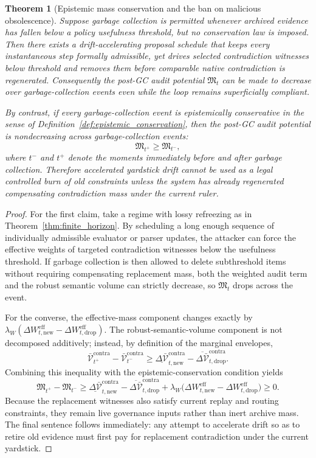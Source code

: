 \documentclass[11pt]{article}
\newtheorem{theorem}{Theorem}[section]
\theoremstyle{definition}
\newcommand{\1}{\mathbf{1}}
\begin{document}
\begin{theorem}[Epistemic mass conservation and the ban on malicious obsolescence]\label{thm:epistemic_conservation}
Suppose garbage collection is permitted whenever archived evidence has fallen below a policy usefulness threshold, but no conservation law is imposed. Then there exists a drift-accelerating proposal schedule that keeps every instantaneous step formally admissible, yet drives selected contradiction witnesses below threshold and removes them before comparable native contradiction is regenerated. Consequently the post-GC audit potential $\mathfrak M_t$ can be made to decrease over garbage-collection events even while the loop remains superficially compliant.

By contrast, if every garbage-collection event is epistemically conservative in the sense of Definition~\ref{def:epistemic_conservation}, then the post-GC audit potential is nondecreasing across garbage-collection events:
\[
\mathfrak M_{t^+} \ge \mathfrak M_{t^-},
\]
where $t^-$ and $t^+$ denote the moments immediately before and after garbage collection. Therefore accelerated yardstick drift cannot be used as a legal controlled burn of old constraints unless the system has already regenerated compensating contradiction mass under the current ruler.
\end{theorem}

\begin{proof}
For the first claim, take a regime with lossy refreezing as in Theorem~\ref{thm:finite_horizon}. By scheduling a long enough sequence of individually admissible evaluator or parser updates, the attacker can force the effective weights of targeted contradiction witnesses below the usefulness threshold. If garbage collection is then allowed to delete subthreshold items without requiring compensating replacement mass, both the weighted audit term and the robust semantic volume can strictly decrease, so $\mathfrak M_t$ drops across the event.

For the converse, the effective-mass component changes exactly by $\lambda_W(\Delta W_{t,\mathrm{new}}^{\mathrm{eff}}-\Delta W_{t,\mathrm{drop}}^{\mathrm{eff}})$. The robust-semantic-volume component is not decomposed additively; instead, by definition of the marginal envelopes,
\[
\bar{\mathcal V}_{t^+}^{\mathrm{contra}}-\bar{\mathcal V}_{t^-}^{\mathrm{contra}}
\ge
\underline{\Delta \bar{\mathcal V}}_{t,\mathrm{new}}^{\mathrm{contra}}-
\overline{\Delta \bar{\mathcal V}}_{t,\mathrm{drop}}^{\mathrm{contra}}.
\]
Combining this inequality with the epistemic-conservation condition yields
\[
\mathfrak M_{t^+}-\mathfrak M_{t^-}
\ge
\underline{\Delta \bar{\mathcal V}}_{t,\mathrm{new}}^{\mathrm{contra}}-
\overline{\Delta \bar{\mathcal V}}_{t,\mathrm{drop}}^{\mathrm{contra}}
+\lambda_W\bigl(\Delta W_{t,\mathrm{new}}^{\mathrm{eff}}-\Delta W_{t,\mathrm{drop}}^{\mathrm{eff}}\bigr)
\ge 0.
\]
Because the replacement witnesses also satisfy current replay and routing constraints, they remain live governance inputs rather than inert archive mass. The final sentence follows immediately: any attempt to accelerate drift so as to retire old evidence must first pay for replacement contradiction under the current yardstick.
\end{proof}
\end{document}
